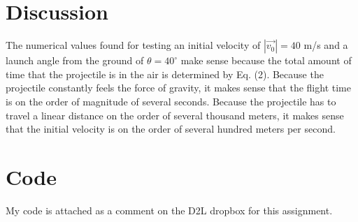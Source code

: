 \documentclass[11pt, oneside]{article}   	%
\begin{document}
\section{Discussion}

The numerical values found for testing an initial velocity of $|\vec{v_{0}}| = 40$ m/s and a launch angle from the ground of $\theta = 40^{\circ}$ make sense because the total amount of time that the projectile is in the air is determined by Eq. (2). Because the projectile constantly feels the force of gravity, it makes sense that the flight time is on the order of magnitude of several seconds. Because the projectile has to travel a linear distance on the order of several thousand meters, it makes sense that the initial velocity is on the order of several hundred meters per second.


\section{Code}

My code is attached as a comment on the D2L dropbox for this assignment.
\end{document}
